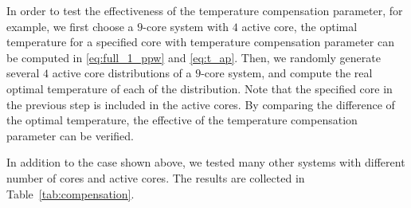 In order to test the effectiveness of the temperature compensation parameter, for example, we first choose a $9$-core system with $4$ active core, the optimal temperature for a specified core with temperature compensation parameter can be computed in \eqref{eq:full_1_ppw} and \eqref{eq:t_ap}. Then, we randomly generate several $4$ active core distributions of a $9$-core system, and compute the real optimal temperature of each of the distribution. Note that the specified core in the previous step is included in the active cores. By comparing the difference of the optimal temperature, the effective of the temperature compensation parameter can be verified.

In addition to the case shown above, we tested many other systems with different number of cores and active cores. The results are collected in Table~\ref{tab:compensation}.

